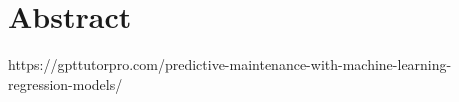 \chapter*{Abstract} %
\label{abtract}
https://gpttutorpro.com/predictive-maintenance-with-machine-learning-regression-models/






